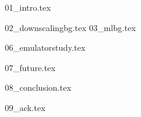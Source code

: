 \documentclass[onecolumn]{article}
\begin{document}

{01_intro.tex}

{02_downscalingbg.tex}
{03_mlbg.tex}

{06_emulatorstudy.tex}

{07_future.tex}

{08_conclusion.tex}

{09_ack.tex}

\printbibliography
\end{document}
